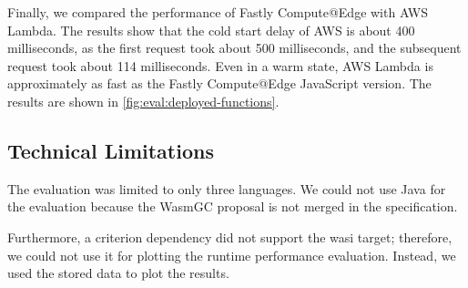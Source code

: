 Finally, we compared the performance of Fastly Compute@Edge with AWS Lambda. The results show that the cold start delay of AWS is about 400 milliseconds, as the first request took about 500 milliseconds, and the subsequent request took about 114 milliseconds. Even in a warm state, AWS Lambda is approximately as fast as the Fastly Compute@Edge JavaScript version. The results are shown in \autoref{fig:eval:deployed-functions}.

\subsection{Technical Limitations}

The evaluation was limited to only three languages. We could not use Java for the evaluation because the WasmGC proposal is not merged in the specification.

Furthermore, a criterion dependency did not support the \gls{wasi} target; therefore, we could not use it for plotting the runtime performance evaluation. Instead, we used the stored data to plot the results.